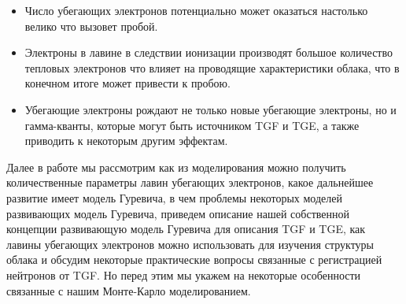 \begin{itemize}
   \item Число убегающих электронов потенциально может оказаться настолько велико что вызовет пробой.
   \item Электроны в лавине в следствии ионизации производят большое количество тепловых электронов что влияет на проводящие характеристики облака, что в конечном итоге может привести к пробою.
   \item Убегающие электроны рождают не только новые убегающие электроны, но и гамма-кванты, которые могут быть источником TGF и TGE, а также приводить к некоторым другим эффектам.
\end{itemize}
Далее в работе мы рассмотрим как из моделирования можно получить количественные параметры лавин убегающих электронов, какое дальнейшее развитие имеет модель Гуревича, в чем проблемы некоторых моделей развивающих модель Гуревича, приведем описание нашей собственной концепции развивающую модель Гуревича для описания TGF и TGE, как лавины убегающих электронов можно использовать для изучения структуры облака и обсудим некоторые практические вопросы связанные с регистрацией нейтронов от TGF. Но перед этим мы укажем на некоторые особенности связанные с нашим Монте-Карло моделированием.






